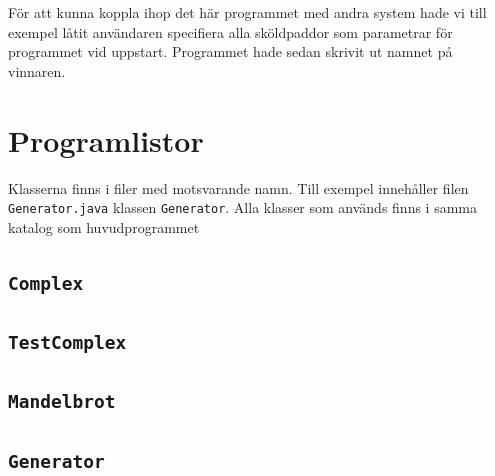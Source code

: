 \documentclass[a4paper]{article}
\newcommand{\code}[1]{\texttt{#1}} %
\begin{document}
För att kunna koppla ihop det här programmet med andra system hade vi till exempel låtit användaren specifiera alla sköldpaddor som parametrar för programmet vid uppstart. Programmet hade sedan skrivit ut namnet på vinnaren.


\section{Programlistor}
Klasserna finns i filer med motsvarande namn. Till exempel innehåller filen  \code{Generator.java} klassen \code{Generator}. Alla klasser som används finns i samma katalog som huvudprogrammet

\subsection{\code{Complex}}

\subsection{\code{TestComplex}}

\subsection{\code{Mandelbrot}}

\subsection{\code{Generator}}
\end{document}

